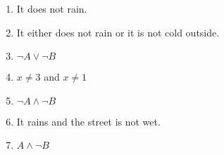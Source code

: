 	\begin{enumerate}
		\item It does not rain.
		\item It either does not rain or it is not cold outside.
		\item $\neg A \lor  \neg B$ 
		\item $x \neq 3 $ and $x \neq 1$
		\item $\neg A \land \neg B$
		\item It rains and the street is not wet.
		\item $A \land \neg B$ 
	\end{enumerate}
